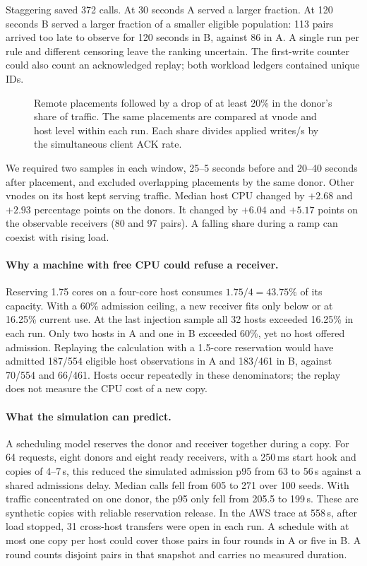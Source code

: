 \documentclass[11pt]{article}
\begin{document}
Staggering saved 372 calls. At 30 seconds A served a larger fraction. At 120 seconds B served a larger fraction of a smaller eligible population: 113 pairs arrived too late to observe for 120 seconds in B, against 86 in A. A single run per rule and different censoring leave the ranking uncertain. The first-write counter could also count an acknowledged replay; both workload ledgers contained unique IDs.

\begin{figure}[H]
\centering
{}
\caption{Remote placements followed by a drop of at least 20\% in the donor's share of traffic. The same placements are compared at vnode and host level within each run. Each share divides applied writes/s by the simultaneous client ACK rate.}
\end{figure}

We required two samples in each window, 25--5 seconds before and 20--40 seconds after placement, and excluded overlapping placements by the same donor. Other vnodes on its host kept serving traffic. Median host CPU changed by $+2.68$ and $+2.93$ percentage points on the donors. It changed by $+6.04$ and $+5.17$ points on the observable receivers (80 and 97 pairs). A falling share during a ramp can coexist with rising load.

\paragraph{Why a machine with free CPU could refuse a receiver.}
Reserving 1.75 cores on a four-core host consumes $1.75/4=43.75\%$ of its capacity. With a 60\% admission ceiling, a new receiver fits only below or at 16.25\% current use. At the last injection sample all 32 hosts exceeded 16.25\% in each run. Only two hosts in A and one in B exceeded 60\%, yet no host offered admission. Replaying the calculation with a 1.5-core reservation would have admitted 187/554 eligible host observations in A and 183/461 in B, against 70/554 and 66/461. Hosts occur repeatedly in these denominators; the replay does not measure the CPU cost of a new copy.

\paragraph{What the simulation can predict.}
A scheduling model reserves the donor and receiver together during a copy. For 64 requests, eight donors and eight ready receivers, with a 250\,ms start hook and copies of 4--7\,s, this reduced the simulated admission p95 from 63 to 56\,s against a shared admissions delay. Median calls fell from 605 to 271 over 100 seeds. With traffic concentrated on one donor, the p95 only fell from 205.5 to 199\,s. These are synthetic copies with reliable reservation release. In the AWS trace at 558\,s, after load stopped, 31 cross-host transfers were open in each run. A schedule with at most one copy per host could cover those pairs in four rounds in A or five in B. A round counts disjoint pairs in that snapshot and carries no measured duration.
\end{document}
